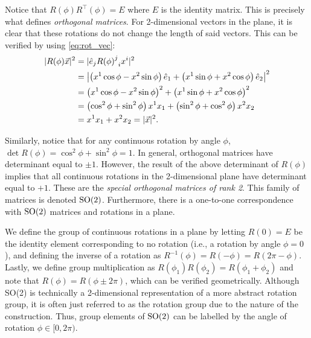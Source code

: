    Notice that $R(\phi)R^\top(\phi) = E$ where $E$ is the identity matrix. This is precisely what defines \textit{orthogonal matrices}. For 2-dimensional vectors in the plane, it is clear that these rotations do not change the length of said vectors. This can be verified by using \cref{eq:rot_vec}:
    \begin{align}
        |R(\phi)\vec{x}|^2 &= |\hat{e}_j{{R(\phi)}^j}_i x^i|^2 \\
        &= \left|\left( x^1\cos\phi - x^2\sin\phi \right)\hat{e}_1 + \left( x^1\sin\phi + x^2\cos\phi \right)\hat{e}_2\right|^2 \nonumber \\
        &= {\left( x^1\cos\phi - x^2\sin\phi \right)}^2 + {\left( x^1\sin\phi + x^2\cos\phi \right)}^2 \nonumber \\
        &= \left( \cos^2\phi + \sin^2\phi \right)x^1 x_1 + \left( \sin^2\phi + \cos^2\phi \right)x^2 x_2 \nonumber \\
        &= x^1 x_1 + x^2 x_2 = |\vec{x}|^2. \nonumber
    \end{align}

    Similarly, notice that for any continuous rotation by angle $\phi$, $\det R(\phi) = \cos^2\phi+\sin^2\phi = 1$. In general, orthogonal matrices have determinant equal to $\pm1$. However, the result of the above determinant of $R(\phi)$ implies that all continuous rotations in the 2-dimensional plane have determinant equal to $+1$. These are the \textit{special orthogonal matrices of rank 2}. This family of matrices is denoted $\textrm{SO}{(2)}$. Furthermore, there is a one-to-one correspondence with $\textrm{SO}{(2)}$ matrices and rotations in a plane.

    We define the group of continuous rotations in a plane by letting $R(0) = E$ be the identity element corresponding to no rotation (i.e., a rotation by angle $\phi=0$), and defining the inverse of a rotation as $R^{-1}(\phi) = R(-\phi) = R(2\pi-\phi)$. Lastly, we define group multiplication as $R(\phi_1)R(\phi_2) = R(\phi_1+\phi_2)$ and note that $R(\phi) = R(\phi\pm2\pi)$, which can be verified geometrically. Although SO(2) is technically a 2-dimensional representation of a more abstract rotation group, it is often just referred to as the rotation group due to the nature of the construction. Thus, group elements of $\textrm{SO}{(2)}$ can be labelled by the angle of rotation $\phi\in[0,2\pi)$.


